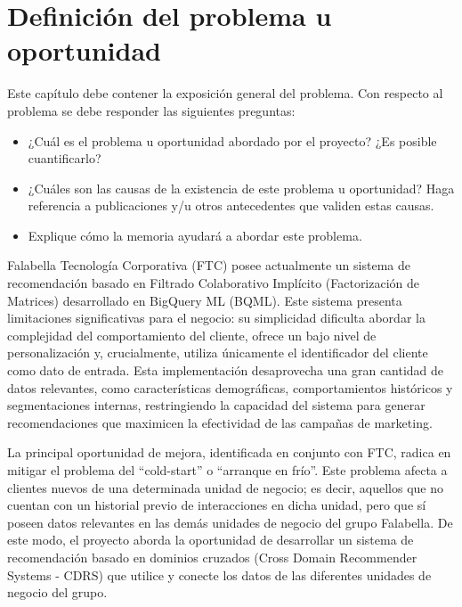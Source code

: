 \chapter{Definición del problema u oportunidad} %
\label{sec:problema} %

Este capítulo debe contener la exposición general del problema. Con respecto al problema se debe responder las siguientes preguntas:
\begin{itemize}
	\item	¿Cuál es el problema u oportunidad abordado por el proyecto? ¿Es posible cuantificarlo?
	\item	¿Cuáles son las causas de la existencia de este problema u oportunidad? Haga referencia a publicaciones y/u otros antecedentes que validen estas causas.
	\item Explique cómo la memoria ayudará a abordar este problema.
	
\end{itemize}

\newpage

Falabella Tecnología Corporativa (FTC) posee actualmente un sistema de recomendación basado en Filtrado Colaborativo Implícito (Factorización de Matrices) desarrollado en BigQuery ML (BQML). Este sistema presenta limitaciones significativas para el negocio: su simplicidad dificulta abordar la complejidad del comportamiento del cliente, ofrece un bajo nivel de personalización y, crucialmente, utiliza únicamente el identificador del cliente como dato de entrada. Esta implementación desaprovecha una gran cantidad de datos relevantes, como características demográficas, comportamientos históricos y segmentaciones internas, restringiendo la capacidad del sistema para generar recomendaciones que maximicen la efectividad de las campañas de marketing.

La principal oportunidad de mejora, identificada en conjunto con FTC, radica en mitigar el problema del \enquote{cold-start} o \enquote{arranque en frío}. Este problema afecta a clientes nuevos de una determinada unidad de negocio; es decir, aquellos que no cuentan con un historial previo de interacciones en dicha unidad, pero que sí poseen datos relevantes en las demás unidades de negocio del grupo Falabella. De este modo, el proyecto aborda la oportunidad de desarrollar un sistema de recomendación basado en dominios cruzados (Cross Domain Recommender Systems - CDRS) que utilice y conecte los datos de las diferentes unidades de negocio del grupo.

